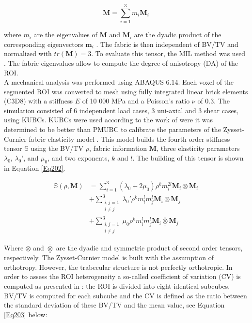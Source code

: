 \documentclass[a4paper,fleqn]{DC_ArtStyle}
\begin{document}
\begin{equation}
	\mathbf{M} = \sum_{i=1}^{3}{m_i \mathbf{M}_i}
	\label{Eq201}
\end{equation}

where $m_i$ are the eigenvalues of $\mathbf{M}$ and $\mathbf{M}_i$ are the dyadic product of the corresponding eigenvectors $\mathbf{m}_i$ \cite{Cowin1985,Harrigan1985}. The fabric is then independent of BV/TV and normalized with $tr(\mathbf{M}) = 3$. To evaluate this tensor, the MIL method was used \cite{Moreno2014}. The fabric eigenvalues allow to compute the degree of anisotropy (DA) of the ROI.\\

A mechanical analysis was performed using \textsc{ABAQUS 6.14}. Each voxel of the segmented ROI was converted to mesh using fully integrated linear brick elements (C3D8) with a stiffness $E$ of 10 000 MPa and a Poisson's ratio $\nu$ of 0.3. The simulation consisted of 6 independent load cases, 3 uni-axial and 3 shear cases, using KUBCs. KUBCs were used according to the work of \citeauthor{Panyasantisuk2015}\cite{Panyasantisuk2015} were it was determined to be better than PMUBC to calibrate the parameters of the Zysset-Curnier fabric-elasticity model \cite{Zysset1995}. This model builds the fourth order stiffness tensor $\mathbb{S}$ using the BV/TV $\rho$, fabric information $\mathbf{M}$, three elasticity parameters $\lambda_0$, $\lambda_0$', and $\mu_0$, and two exponents, $k$ and $l$. The building of this tensor is shown in Equation \ref{Eq202}.

\begin{equation}
	\begin{split}
		\mathbb{S}(\rho,\mathbf{M}) & = \sum_{i=1}^{3} (\lambda_0 + 2\mu_0)\rho^k m_i^{2l} \mathbf{M}_i \otimes \mathbf{M}_i \\ & + \sum_{\substack{i,j=1\\i \neq j}}^{3} \lambda_0' \rho^k m_i^{l} m_j^{l} \mathbf{M}_i \otimes \mathbf{M}_j \\ & + \sum_{\substack{i,j=1\\i \neq j}}^{3} \mu_0 \rho^k m_i^{l} m_j^{l} \mathbf{M}_i \overline{\underline{\otimes}} \mathbf{M}_j
	\end{split}
	\label{Eq202}
\end{equation}

Where $\otimes$ and $\overline{\underline{\otimes}}$ are the dyadic and symmetric product of second order tensors, respectively. The Zysset-Curnier model is built with the assumption of orthotropy. However, the trabecular structure is not perfectly orthotropic. In order to assess the ROI heterogeneity a so-called coefficient of variation (CV) is computed as presented in \cite{Panyasantisuk2015}: the ROI is divided into eight identical subcubes, BV/TV is computed for each subcube and the CV is defined as the ratio between the standard deviation of these BV/TV and the mean value, see Equation \ref{Eq203} below:
\end{document}

